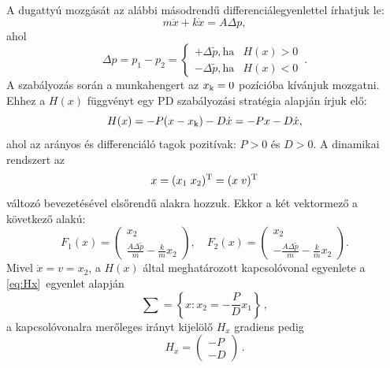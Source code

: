 A dugattyú mozgását az alábbi másodrendű differenciálegyenlettel írhatjuk le:
%
\begin{equation}
m \ddot{x} + k \dot{x} = A \Delta p, 
\end{equation}
%
\noindent ahol 
%
\begin{equation}
	\Delta p = p_1- p_2 = \left\{
	\begin{matrix}
	+\Delta \tilde{p}, \mathrm{ha} & H(x) > 0\\
	-\Delta \tilde{p}, \mathrm{ha} & H(x) < 0
	\end{matrix}\,.
	\right. 
\end{equation}
%
\indent A szabályozás során a munkahengert az $x_{\rm k} = 0$ pozícióba kívánjuk mozgatni. Ehhez a $H(x)$ függvényt egy PD szabályozási stratégia alapján írjuk elő:
%
\begin{equation} \label{eq:Hx}
H(x) = -P (x - x_{\rm k}) - D \dot{x} = -P x - D \dot{x},
\end{equation}
%
ahol az arányos és differenciáló tagok pozitívak: $P > 0$ és $D > 0$. A dinamikai rendszert az 
%
\begin{equation}
x = (x_1 \; x_2)^{\rm T} = (x \; v)^{\rm T} 
\end{equation}
\noindent változó bevezetésével elsőrendű alakra hozzuk. Ekkor a két vektormező a következő alakú:
%
\begin{equation}
F_1(x) = \left(
\begin{matrix}
x_2\\
\frac{A \Delta \tilde{p}}{m} - \frac{k}{m} x_2
\end{matrix}
\right), \quad
F_2(x) = \left(
\begin{matrix}
x_2\\
-\frac{A \Delta \tilde{p}}{m} - \frac{k}{m} x_2
\end{matrix}
\right). 
\end{equation}
%
\noindent Mivel $\dot{x}=v=x_2$, a $H(x)$ által meghatározott kapcsolóvonal egyenlete a \eqref{eq:Hx}~egyenlet alapján
%
\begin{equation}
\sum = \left\{x: x_2 = -\frac{P}{D} x_1 \right\}\,,
\end{equation}
%
\noindent a kapcsolóvonalra merőleges irányt kijelölő $H_x$ gradiens pedig
%
\begin{equation}
H_x = \left(
\begin{matrix}
-P\\
-D
\end{matrix}\right) \,.
\end{equation}

